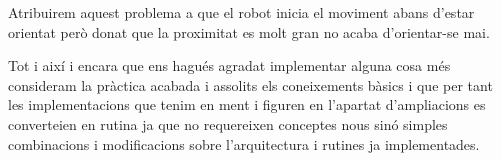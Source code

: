 Atribuirem aquest problema a que el robot inicia el moviment abans d'estar 
orientat però donat que la proximitat es molt gran no acaba d'orientar-se mai.

Tot i així i encara que ens hagués agradat implementar alguna cosa més
consideram la pràctica acabada i assolits els coneixements bàsics i que per tant
les implementacions que tenim en ment i figuren en l'apartat d'ampliacions es
converteien en rutina ja que no requereixen conceptes nous sinó simples
combinacions i modificacions sobre l'arquitectura i rutines ja implementades.